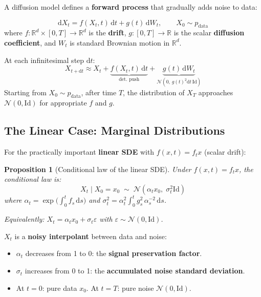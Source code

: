 \documentclass[11pt, a4paper]{article}
\newcommand{\Rd}{\mathbb{R}}
\newcommand{\Id}{\mathrm{Id}}
\newcommand{\pdata}{p_{\mathrm{data}}}
\newcommand{\dd}{\mathrm{d}}
\theoremstyle{plain}
\newtheorem{proposition}[theorem]{Proposition}
\theoremstyle{definition}
\theoremstyle{remark}
\begin{document}
A diffusion model defines a \textbf{forward process} that gradually adds noise to data:

\begin{thmbox}
\begin{equation}
  \dd X_t = f(X_t, t)\,\dd t + g(t)\,\dd W_t, \qquad X_0 \sim \pdata
  \label{eq:forward_sde}
\end{equation}
where $f : \Rd^d \times [0,T] \to \Rd^d$ is the \textbf{drift}, $g : [0,T] \to \Rd$ is the scalar \textbf{diffusion coefficient}, and $W_t$ is standard Brownian motion in $\Rd^d$.
\end{thmbox}

\begin{intubox}
At each infinitesimal step $\dd t$:
\[
  X_{t+\dd t} \approx X_t + \underbrace{f(X_t, t)\,\dd t}_{\text{det.\ push}} + \underbrace{g(t)\,\dd W_t}_{\mathcal{N}(0,\, g(t)^2 \dd t\,\Id)}
\]
Starting from $X_0 \sim \pdata$, after time $T$, the distribution of $X_T$ approaches $\mathcal{N}(0, \Id)$ for appropriate $f$ and $g$.
\end{intubox}

\subsection{The Linear Case: Marginal Distributions}

For the practically important \textbf{linear SDE} with $f(x,t) = f_t x$ (scalar drift):

\begin{proposition}[Conditional law of the linear SDE]
\label{prop:linear_sde}
Under $f(x,t) = f_t x$, the conditional law is:
\[
  X_t \mid X_0 = x_0 \;\sim\; \mathcal{N}\!\left(\alpha_t x_0,\; \sigma_t^2 \Id\right)
\]
where $\alpha_t = \exp\!\bigl(\int_0^t f_s\,\dd s\bigr)$ and $\sigma_t^2 = \alpha_t^2 \int_0^t g_s^2\,\alpha_s^{-2}\,\dd s$.

Equivalently: $X_t = \alpha_t x_0 + \sigma_t \varepsilon$ with $\varepsilon \sim \mathcal{N}(0, \Id)$.
\end{proposition}

\begin{intubox}
$X_t$ is a \textbf{noisy interpolant} between data and noise:
\begin{itemize}
  \item $\alpha_t$ decreases from 1 to 0: the \textbf{signal preservation factor}.
  \item $\sigma_t$ increases from 0 to 1: the \textbf{accumulated noise standard deviation}.
  \item At $t=0$: pure data $x_0$. At $t=T$: pure noise $\mathcal{N}(0,\Id)$.
\end{itemize}
\end{intubox}
\end{document}

